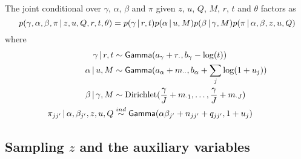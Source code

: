 The joint conditional over $\gamma$, $\alpha$, $\beta$ and $\pi$ given
$z$, $u$, $Q$, $M$, $r$, $t$ and $\theta$ factors as
\begin{equation}
  \label{eq:46} p(\gamma, \alpha, \beta, \pi \, \vert \, z, u, Q, r, t,
\theta) = p(\gamma \, \vert \, r, t) p(\alpha \, \vert \, u, M) p(\beta \, \vert \,
\gamma, M) p(\pi \, \vert \, \alpha, \beta, z, u, Q)
\end{equation} where
\begin{align}
  \label{eq:64} \gamma \, \vert \, r, t &\sim \mathsf{Gamma}(a_{\gamma} +
r_{\cdot},b_{\gamma} - \log(t)) \\ \alpha \, \vert \, u, M &\sim
\mathsf{Gamma}(a_{\alpha} + m_{\cdot\cdot},b_{\alpha} + \sum_j \log(1 + u_j))
\\ \beta \, \vert \, \gamma, M &\sim \mathrm{Dirichlet}(\frac{\gamma}{J} +
m_{\cdot 1}, \dots, \frac{\gamma}{J} + m_{\cdot J}) \\ \pi_{jj'}
\, \vert \, \alpha, \beta_{j'}, z, u, Q &\stackrel{ind}{\sim}
\mathsf{Gamma}(\alpha\beta_{j'} + n_{jj'} + q_{jj'},1 + u_j)
\end{align}


\subsection{Sampling $z$ and the auxiliary variables}
\label{sec:sampling-z_t}

